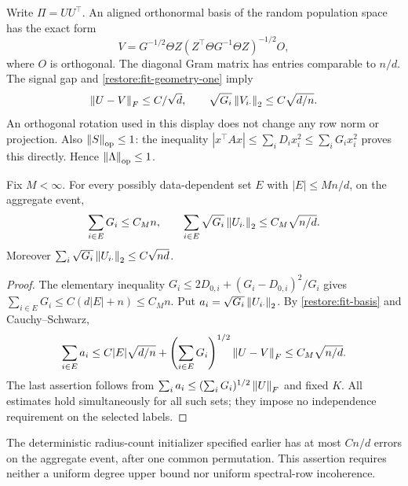 Write $\Pi=UU^\top$. An aligned orthonormal basis of the random
population space has the exact form
\[
 V=G^{-1/2}\Theta Z
       (Z^\top\Theta G^{-1}\Theta Z)^{-1/2}O,
\]
where $O$ is orthogonal. The diagonal Gram matrix has entries comparable
to $n/d$. The signal gap and \eqref{restore:fit-geometry-one} imply
\begin{equation}\label{restore:fit-basis}
 \left\lVert U-V\right\rVert_F\le C/\sqrt d,\qquad
 \sqrt{G_i}\left\lVert V_{i\cdot}\right\rVert_2\le C\sqrt{d/n}.
\end{equation}
An orthogonal rotation used in this display does not change any row
norm or projection. Also $\left\lVert S\right\rVert_{\mathrm{op}}\le1$: the inequality
$|x^\top Ax|\le\sum_iD_ix_i^2\le\sum_iG_ix_i^2$ proves this directly.
Hence $\left\lVert\Lambda\right\rVert_{\mathrm{op}}\le1$.

\begin{lemma}
\label{restore:fit-wrong-mass}
Fix $M<\infty$. For every possibly data-dependent set $E$ with
$|E|\le Mn/d$, on the aggregate event,
\begin{equation}\label{restore:fit-wrong-mass-bounds}
 \sum_{i\in E}G_i\le C_Mn,\qquad
 \sum_{i\in E}\sqrt{G_i}\left\lVert U_{i\cdot}\right\rVert_2
       \le C_M\sqrt{n/d}.
\end{equation}
Moreover
$\sum_i\sqrt{G_i}\left\lVert U_{i\cdot}\right\rVert_2\le C\sqrt{nd}$.
\end{lemma}

\begin{proof}
The elementary inequality
$G_i\le2D_{0,i}+(G_i-D_{0,i})^2/G_i$ gives
$\sum_{i\in E}G_i\le C(d|E|+n)\le C_Mn$.
Put $a_i=\sqrt{G_i}\left\lVert U_{i\cdot}\right\rVert_2$.
By \eqref{restore:fit-basis} and Cauchy--Schwarz,
\[
 \sum_{i\in E}a_i
 \le C|E|\sqrt{d/n}
      +\left(\sum_{i\in E}G_i\right)^{1/2}\left\lVert U-V\right\rVert_F
 \le C_M\sqrt{n/d}.
\]
The last assertion follows from
$\sum_i a_i\le(\sum_iG_i)^{1/2}\left\lVert U\right\rVert_F$ and fixed $K$.
All estimates hold simultaneously for all such sets; they impose no
independence requirement on the selected labels.
\end{proof}

\begin{lemma}
\label{restore:fit-initializer}
The deterministic radius-count initializer specified earlier has at most
$C n/d$ errors on the aggregate event, after one common permutation.
This assertion requires neither a uniform degree upper bound nor
uniform spectral-row incoherence.
\end{lemma}

